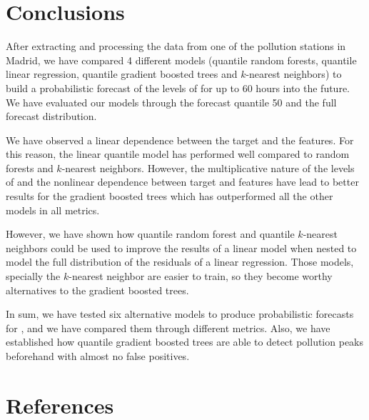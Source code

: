 \documentclass[a4paper,3p,sort&compress]{elsarticle}
\begin{document}
\section{Conclusions}
\label{sec:concl}

After extracting and processing the data from one of the pollution
stations in Madrid, we have compared 4 different models (quantile
random forests, quantile linear regression, quantile gradient boosted
trees and $k$-nearest neighbors) to build a probabilistic forecast of
the levels of \no for up to 60 hours into the future. We have
evaluated our models through the forecast quantile 50 and the full
forecast distribution.

We have observed a linear dependence between the target and the
features. For this reason, the linear quantile model has performed
well compared to random forests and $k$-nearest neighbors. However,
the multiplicative nature of the levels of \no and the nonlinear
dependence between target and features have lead to better results for
the gradient boosted trees which has outperformed all the other models
in all metrics.

However, we have shown how quantile random forest and quantile
$k$-nearest neighbors could be used to improve the results of a linear
model when nested to model the full distribution of the residuals of a
linear regression. Those models, specially the $k$-nearest neighbor
are easier to train, so they become worthy alternatives to the
gradient boosted trees.

In sum, we have tested six alternative models to produce probabilistic
forecasts for \no, and we have compared them through different
metrics.  Also, we have established how quantile gradient boosted
trees are able to detect pollution peaks beforehand with almost no
false positives.


\section*{References}


\end{document}
